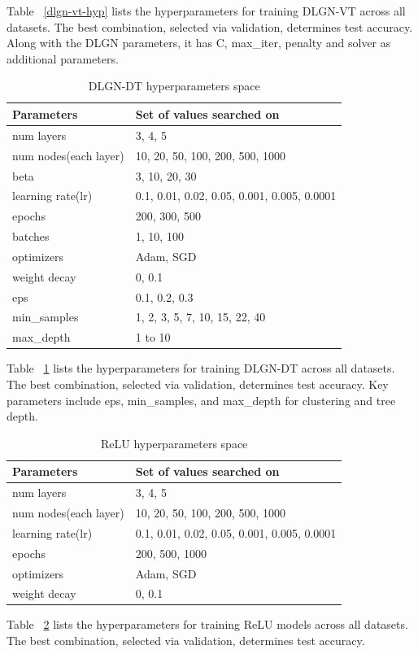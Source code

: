 \documentclass{article} %
\renewcommand{\>}{{\rightarrow}}
\renewcommand{\=}{\stackrel{\triangle}{=}}
\newcommand{\0}{{\mathbf 0}}
\begin{document}
Table ~\ref{dlgn-vt-hyp} lists the hyperparameters for training DLGN-VT across all datasets. The best combination, selected via validation, determines test accuracy. Along with the DLGN parameters, it has C, max\_iter, penalty and solver as additional parameters.

\begin{table}[htbp]
\caption{DLGN-DT hyperparameters space}
\label{dlgn-dt-hyp}
\begin{center}
\begin{tabular}{|p{4cm}|p{8cm}|}
\hline
Parameters &Set of values searched on\\
 \hline
num layers     &3, 4, 5\\
num nodes(each layer)   &10, 20, 50, 100, 200, 500, 1000\\
beta  &3, 10, 20, 30\\
learning rate(lr)     &0.1, 0.01, 0.02, 0.05, 0.001, 0.005, 0.0001\\
epochs   &200, 300, 500\\
batches  &1, 10, 100\\
optimizers     &Adam, SGD\\
weight decay   &0, 0.1\\
eps &0.1, 0.2, 0.3\\
min\_samples &1, 2, 3, 5, 7, 10, 15, 22, 40\\
max\_depth &1 to 10\\
\hline 
\end{tabular}
\end{center}
\end{table}

Table ~\ref{dlgn-dt-hyp} lists the hyperparameters for training DLGN-DT across all datasets. The best combination, selected via validation, determines test accuracy. Key parameters include eps, min\_samples, and max\_depth for clustering and tree depth.

\begin{table}[htbp]
\caption{ReLU hyperparameters space}
\label{relu-hyp}
\begin{center}
\begin{tabular}{|p{4cm}|p{8cm}|}
\hline
Parameters &Set of values searched on\\
 \hline
num layers     &3, 4, 5\\
num nodes(each layer)   &10, 20, 50, 100, 200, 500, 1000\\
learning rate(lr)     &0.1, 0.01, 0.02, 0.05, 0.001, 0.005, 0.0001\\
epochs   &200, 500, 1000\\
optimizers     &Adam, SGD\\
weight decay   &0, 0.1\\
\hline 
\end{tabular}
\end{center}
\end{table}
Table ~\ref{relu-hyp} lists the hyperparameters for training ReLU models across all datasets. The best combination, selected via validation, determines test accuracy.
\end{document}
